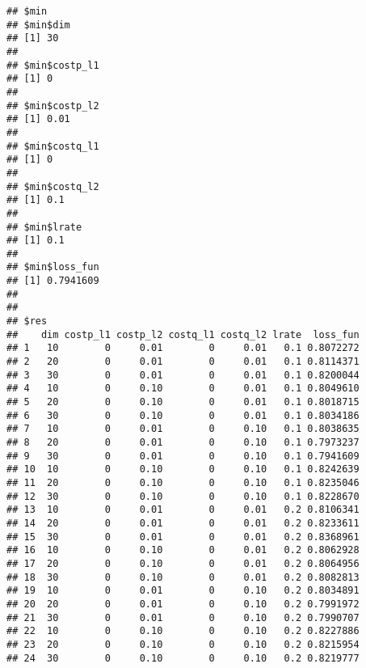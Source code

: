 \documentclass[
]{article}
\newenvironment{Shaded}{\begin{snugshade}}{\end{snugshade}}
\newcommand{\CommentTok}[1]{\textcolor[rgb]{0.56,0.35,0.01}{\textit{#1}}}
\newcommand{\DataTypeTok}[1]{\textcolor[rgb]{0.13,0.29,0.53}{#1}}
\newcommand{\DecValTok}[1]{\textcolor[rgb]{0.00,0.00,0.81}{#1}}
\newcommand{\KeywordTok}[1]{\textcolor[rgb]{0.13,0.29,0.53}{\textbf{#1}}}
\newcommand{\NormalTok}[1]{#1}
\newcommand{\OperatorTok}[1]{\textcolor[rgb]{0.81,0.36,0.00}{\textbf{#1}}}
\begin{document}
\begin{verbatim}
## $min
## $min$dim
## [1] 30
## 
## $min$costp_l1
## [1] 0
## 
## $min$costp_l2
## [1] 0.01
## 
## $min$costq_l1
## [1] 0
## 
## $min$costq_l2
## [1] 0.1
## 
## $min$lrate
## [1] 0.1
## 
## $min$loss_fun
## [1] 0.7941609
## 
## 
## $res
##    dim costp_l1 costp_l2 costq_l1 costq_l2 lrate  loss_fun
## 1   10        0     0.01        0     0.01   0.1 0.8072272
## 2   20        0     0.01        0     0.01   0.1 0.8114371
## 3   30        0     0.01        0     0.01   0.1 0.8200044
## 4   10        0     0.10        0     0.01   0.1 0.8049610
## 5   20        0     0.10        0     0.01   0.1 0.8018715
## 6   30        0     0.10        0     0.01   0.1 0.8034186
## 7   10        0     0.01        0     0.10   0.1 0.8038635
## 8   20        0     0.01        0     0.10   0.1 0.7973237
## 9   30        0     0.01        0     0.10   0.1 0.7941609
## 10  10        0     0.10        0     0.10   0.1 0.8242639
## 11  20        0     0.10        0     0.10   0.1 0.8235046
## 12  30        0     0.10        0     0.10   0.1 0.8228670
## 13  10        0     0.01        0     0.01   0.2 0.8106341
## 14  20        0     0.01        0     0.01   0.2 0.8233611
## 15  30        0     0.01        0     0.01   0.2 0.8368961
## 16  10        0     0.10        0     0.01   0.2 0.8062928
## 17  20        0     0.10        0     0.01   0.2 0.8064956
## 18  30        0     0.10        0     0.01   0.2 0.8082813
## 19  10        0     0.01        0     0.10   0.2 0.8034891
## 20  20        0     0.01        0     0.10   0.2 0.7991972
## 21  30        0     0.01        0     0.10   0.2 0.7990707
## 22  10        0     0.10        0     0.10   0.2 0.8227886
## 23  20        0     0.10        0     0.10   0.2 0.8215954
## 24  30        0     0.10        0     0.10   0.2 0.8219777
\end{verbatim}

\begin{Shaded}
\end{Shaded}
\end{document}
